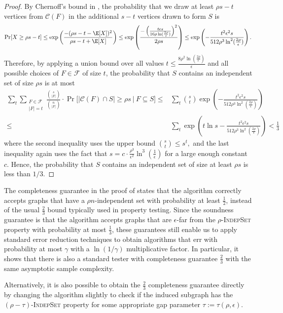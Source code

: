 \documentclass[11pt]{article}
\begin{document}
\begin{proof}
By Chernoff's bound in , the probability that we draw at least $\rho s - t$ vertices from $\mathcal{C}(F)$ in the additional $s - t$ vertices drawn to form $S$ is
\[
\Pr[ X \ge \rho s - t] 
\le \exp\left(\frac{-(\rho s-t-\E[X])^2}{\rho s - t+\E[X]}\right)
\leq \exp\left(\frac{-\left(\frac{t \epsilon s}{16 \rho \ln(\frac{2\rho}{\epsilon})}\right)^2}{2\rho s}\right)
\leq \exp\left(-\frac{t^2\epsilon^2s}{512 \rho^3\ln^2(\frac{2\rho}{\epsilon})} \right).
\]
Therefore, by applying a union bound over all values $t \le \frac{8\rho^2 \ln(\frac{2\rho}{\epsilon})}{\epsilon}$ and all possible choices of $F \in \mathcal{F}$ of size $t$, the probability that $S$ contains an independent set of size $\rho s$ is at most
\begin{align*}
\sum_{t} \sum_{\substack{F \in \mathcal{F} \\ |F|=t}} \frac{\binom{s}{|F|}}{\binom{n}{|F|}} \cdot \Pr\big[|\mathcal{C}(F) \cap S| \geq \rho s ~\big|~ F \subseteq S\big] 
\le & \sum_t \binom{s}{t} \exp\left(-\frac{t^2\epsilon^2s}{512 \rho^3\ln^2(\frac{2\rho}{\epsilon})} \right) \\
\le & \sum_t \exp\left( t \ln s - \frac{t^2\epsilon^2s}{512 \rho^3\ln^2(\frac{2\rho}{\epsilon})} \right) < \frac13
\end{align*}
where the second inequality uses the upper bound $\binom{s}{t} \le s^t,$ and the last inequality again uses the fact that $s = c \cdot \frac{\rho^3}{\epsilon^2} \ln^3(\frac{1}{\epsilon})$ for a large enough constant $c$. Hence, the probability that $S$ contains an independent set of size at least $\rho s$ is less than $1/3.$
\end{proof}

\begin{remark}
The completeness guarantee in the proof of  states that the algorithm correctly accepts graphs that have a $\rho n$-independent set with probability at least $\frac12$, instead of the usual $\frac23$ bound typically used in property testing. Since the soundness guarantee is that the algorithm accepts graphs that are $\epsilon$-far from the \textsc{$\rho$-IndepSet} property with probability at most $\frac13$, these guarantees still enable us to apply standard error reduction techniques to obtain algorithms that err with probability at most $\gamma$ with a $\ln(1/\gamma)$ multiplicative factor. In particular, it shows that there is also a standard tester with completeness guarantee $\frac23$ with the same asymptotic sample complexity.

Alternatively, it is also possible to obtain the $\frac23$ completeness guarantee directly by changing the algorithm slightly to check if the induced subgraph has the \textsc{$(\rho - \tau)$-IndepSet} property for some appropriate gap parameter $\tau := \tau(\rho,\epsilon)$. 
\end{remark}
\end{document}

